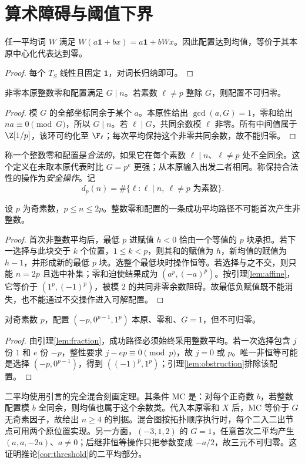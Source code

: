 \section{算术障碍与阈值下界}\label{sec:obstruction}
\begin{lemma}\label{lem:affine}
任一平均词 $W$ 满足 $W(a\mathbf1+bx)=a\mathbf1+bWx$。因此配置达到均值，等价于其本原中心化代表达到零。
\end{lemma}
\begin{proof}
每个 $T_S$ 线性且固定 $\mathbf1$，对词长归纳即可。
\end{proof}

\begin{lemma}\label{lem:obstruction}
非零本原整数零和配置满足 $G\mid n$。若素数 $\ell\ne p$ 整除 $G$，则配置不可归零。
\end{lemma}
\begin{proof}
模 $G$ 的全部坐标同余于某个 $a$。本原性给出 $\gcd(a,G)=1$，零和给出 $na\equiv0\pmod G$，所以 $G\mid n$。若 $\ell\mid G$，共同余数模 $\ell$ 非零。所有中间值属于 $\Z[1/p]$，该环可约化至 $\F_\ell$；每次平均保持这个非零共同余数，故不能归零。
\end{proof}

称一个整数零和配置是\emph{合法的}，如果它在每个素数 $\ell\mid n$、$\ell\ne p$ 处不全同余。这个定义在未取本原代表时比 $G=p^e$ 更强；从本原输入出发二者相同。称保持合法性的操作为\emph{安全操作}。记
\[
d_p(n)=\#\{\ell:\ell\mid n,\ \ell\ne p\text{ 为素数}\}.
\]

\begin{lemma}\label{lem:fraction}
设 $p$ 为奇素数，$p\le n\le2p$。整数零和配置的一条成功平均路径不可能首次产生非整数。
\end{lemma}
\begin{proof}
首次非整数平均后，最低 $p$ 进赋值 $h<0$ 恰由一个等值的 $p$ 块承担。若下一选择与此块交于 $k$ 个位置，$1\le k<p$，则其和的赋值为 $h$，新均值的赋值为 $h-1$，并形成新的最低 $p$ 块。选整个最低块时操作恒等。若选择与之不交，则只能 $n=2p$ 且选中补集；零和迫使结果成为 $(a^p,(-a)^p)$。按引理\ref{lem:affine}，它等价于 $(1^p,(-1)^p)$，被模 $2$ 的共同非零余数阻碍。故最低负赋值既不能消失，也不能通过不交操作进入可解配置。
\end{proof}

\begin{proposition}\label{prop:lower}
对奇素数 $p$，配置 $(-p,0^{p-1},1^p)$ 本原、零和、$G=1$，但不可归零。
\end{proposition}
\begin{proof}
由引理\ref{lem:fraction}，成功路径必须始终采用整数平均。若一次选择包含 $j$ 份 $1$ 和 $e$ 份 $-p$，整性要求 $j-ep\equiv0\pmod p$，故 $j=0$ 或 $p$。唯一非恒等可能是选择 $(-p,0^{p-1})$，得到 $((-1)^p,1^p)$；引理\ref{lem:obstruction}排除该配置。
\end{proof}

二平均使用\cite{mixing}引言的完全混合刻画定理。其条件 MC 是：对每个正奇数 $b$，若整数配置模 $b$ 全同余，则均值也属于这个余数类。代入本原零和 $X$ 后，MC 等价于 $G$ 无奇素因子，故给出 $n\ge4$ 的判据。混合图按拓扑顺序执行时，每个二入二出节点可用两个原位置实现。另一方面，$(-3,1,2)$ 的 $G=1$，任意首次二平均产生 $(a,a,-2a)$、$a\ne0$；后继非恒等操作只把参数变成 $-a/2$，故三元不可归零。这证明推论\ref{cor:threshold}的二平均部分。


